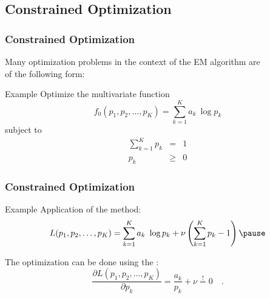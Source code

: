 \subsection{Constrained Optimization}

\begin{frame}
  \frametitle{Constrained Optimization}

  Many optimization problems in the context of the EM algorithm are \\
  of the following form: \\[.25cm]

  \begin{ovalblock}{Example}
    \small
    Optimize the multivariate function
    {\footnotesize
      \begin{displaymath}
        f_0(p_1,p_2,\dots,p_K) = \sum_{k=1}^{K} a_k \ \log p_k
      \end{displaymath}
    }
%    
    subject to
    {\footnotesize
      \begin{eqnarray*}
        \sum_{k=1}^K p_k & =    & 1 \\
        p_k              & \geq & 0
      \end{eqnarray*}
    }
    \vspace{-.5cm}
  \end{ovalblock}
\end{frame}


\begin{frame}
  \frametitle{Constrained Optimization \cont}
  
  \begin{ovalblock}{Example}
    \small
    Application of the  method:
    {\footnotesize
      \begin{displaymath}
        L(p_1,p_2,\dots,p_K) = 
        \sum_{k=1}^K a_k\ \log p_k + \nu \left( \sum_{k=1}^K p_k-1 \right) \pause
      \end{displaymath}
    }
    
    The optimization can be done using the :
    {\footnotesize
      \begin{displaymath}
        \frac{\partial L(p_1,p_2,\dots,p_K)}{\partial p_k} =
        \frac{a_k}{p_k} + \nu \stackrel{!}{=} 0 \quad .
      \end{displaymath}
    }
    \vspace{-.25cm}
  \end{ovalblock}
\end{frame}


